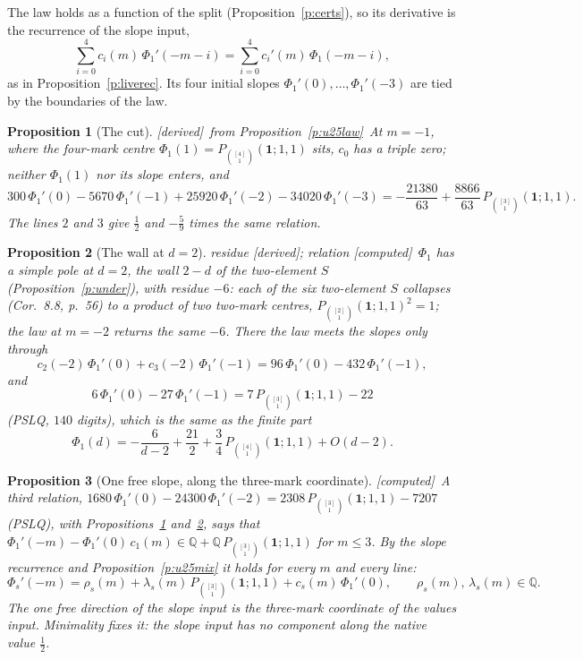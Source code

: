 \documentclass[11pt]{article}
\newcommand{\one}{\mathbf 1}
\newcommand{\Pth}{P_{\binom{[3]}1}(\one;1,1)}
\newcommand{\Pfour}{P_{\binom{[4]}1}(\one;1,1)}
\theoremstyle{plain}
\newtheorem{proposition}{Proposition}[section]
\theoremstyle{definition}
\theoremstyle{remark}
\newcommand{\derived}{\textup{[derived]}}
\newcommand{\computed}{\textup{[computed]}}
\begin{document}
The law holds as a function of the split (Proposition~\ref{p:certs}), so its derivative is the recurrence of the slope input,
\[
\sum_{i=0}^4c_i(m)\,\Phi_1'(-m-i)=\sum_{i=0}^4c_i'(m)\,\Phi_1(-m-i),
\]
as in Proposition~\ref{p:liverec}. Its four initial slopes $\Phi_1'(0),\dots,\Phi_1'(-3)$ are tied by the boundaries of the law.

\begin{proposition}[The cut]\label{p:u25cut}\derived\ from Proposition~\ref{p:u25law}\
At $m=-1$, where the four-mark centre $\Phi_1(1)=\Pfour$ sits, $c_0$ has a triple zero; neither $\Phi_1(1)$ nor its slope enters, and
\[
300\,\Phi_1'(0)-5670\,\Phi_1'(-1)+25920\,\Phi_1'(-2)-34020\,\Phi_1'(-3)=-\frac{21380}{63}+\frac{8866}{63}\,\Pth .
\]
The lines $2$ and $3$ give $\frac12$ and $-\frac59$ times the same relation.
\end{proposition}

\begin{proposition}[The wall at $d=2$]\label{p:u25wall}residue \derived; relation \computed\
$\Phi_1$ has a simple pole at $d=2$, the wall $2-d$ of the two-element $S$ (Proposition~\ref{p:under}), with residue $-6$: each of the six two-element $S$ collapses (Cor.~8.8, p.~56) to a product of two two-mark centres, $P_{\binom{[2]}1}(\one;1,1)^2=1$; the law at $m=-2$ returns the same $-6$. There the law meets the slopes only through
\[
c_2(-2)\,\Phi_1'(0)+c_3(-2)\,\Phi_1'(-1)=96\,\Phi_1'(0)-432\,\Phi_1'(-1),
\]
and
\[
6\,\Phi_1'(0)-27\,\Phi_1'(-1)=7\,\Pth-22
\]
(PSLQ, $140$ digits), which is the same as the finite part
\[
\Phi_1(d)=-\frac{6}{d-2}+\frac{21}2+\frac34\,\Pfour+O(d-2).
\]
\end{proposition}

\begin{proposition}[One free slope, along the three-mark coordinate]\label{p:u25free}\computed\
A third relation, $1680\,\Phi_1'(0)-24300\,\Phi_1'(-2)=2308\,\Pth-7207$ (PSLQ), with Propositions~\ref{p:u25cut} and~\ref{p:u25wall}, says that $\Phi_1'(-m)-\Phi_1'(0)\,c_1(m)\in\mathbb Q+\mathbb Q\,\Pth$ for $m\le3$. By the slope recurrence and Proposition~\ref{p:u25mix} it holds for every $m$ and every line:
\[
\Phi_s'(-m)=\rho_s(m)+\lambda_s(m)\,\Pth+c_s(m)\,\Phi_1'(0),\qquad \rho_s(m),\,\lambda_s(m)\in\mathbb Q .
\]
The one free direction of the slope input is the three-mark coordinate of the values input. Minimality fixes it: the slope input has no component along the native value $\frac12$.
\end{proposition}
\end{document}
